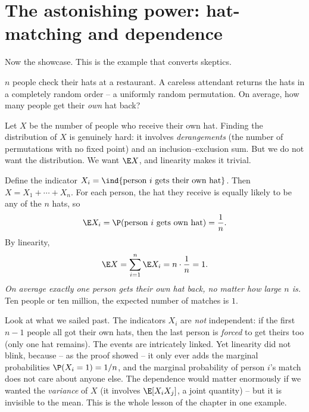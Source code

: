 \section{The astonishing power: hat-matching and dependence}
\label{ch08:hat-matching}

Now the showcase. This is the example that converts skeptics.

\begin{example}
\label{ch08:ex-hats}
$n$ people check their hats at a restaurant. A careless attendant returns the
hats in a completely random order -- a uniformly random permutation. On average,
how many people get their \emph{own} hat back?

Let $X$ be the number of people who receive their own hat. Finding the
distribution of $X$ is genuinely hard: it involves \emph{derangements} (the
number of permutations with no fixed point) and an inclusion--exclusion sum. But
we do not want the distribution. We want $\E X$, and linearity makes it trivial.

Define the indicator $X_i = \ind\{\text{person } i \text{ gets their own hat}\}$.
Then $X = X_1 + \cdots + X_n$. For each person, the hat they receive is equally
likely to be any of the $n$ hats, so
\[
  \E X_i = \P(\text{person } i \text{ gets own hat}) = \frac{1}{n}.
\]
By linearity,
\[
  \E X = \sum_{i=1}^n \E X_i = n \cdot \frac{1}{n} = 1.
\]
\emph{On average exactly one person gets their own hat back, no matter how large
$n$ is.} Ten people or ten million, the expected number of matches is $1$.
\end{example}

\begin{happeningbox}
Look at what we sailed past. The indicators $X_i$ are \emph{not} independent: if
the first $n-1$ people all got their own hats, then the last person is
\emph{forced} to get theirs too (only one hat remains). The events are
intricately linked. Yet linearity did not blink, because -- as the proof showed --
it only ever adds the marginal probabilities $\P(X_i = 1) = 1/n$, and the
marginal probability of person $i$'s match does not care about anyone else. The
dependence would matter enormously if we wanted the \emph{variance} of $X$ (it
involves $\E[X_iX_j]$, a joint quantity) -- but it is invisible to the mean.
This is the whole lesson of the chapter in one example.
\end{happeningbox}

